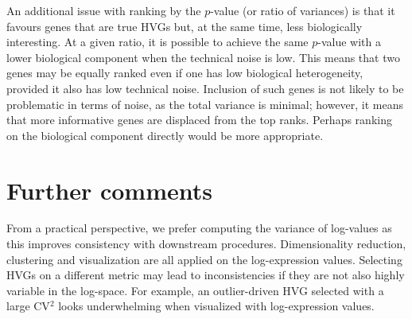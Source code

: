 \documentclass{article}
\begin{document}
An additional issue with ranking by the $p$-value (or ratio of variances) is that it favours genes that are true HVGs but, at the same time, less biologically interesting.
At a given ratio, it is possible to achieve the same $p$-value with a lower biological component when the technical noise is low.
This means that two genes may be equally ranked even if one has low biological heterogeneity, provided it also has low technical noise.
Inclusion of such genes is not likely to be problematic in terms of noise, as the total variance is minimal;
however, it means that more informative genes are displaced from the top ranks.
Perhaps ranking on the biological component directly would be more appropriate.

\section{Further comments}
From a practical perspective, we prefer computing the variance of log-values as this improves consistency with downstream procedures.
Dimensionality reduction, clustering and visualization are all applied on the log-expression values.
Selecting HVGs on a different metric may lead to inconsistencies if they are not also highly variable in the log-space.
For example, an outlier-driven HVG selected with a large CV$^2$ looks underwhelming when visualized with log-expression values.
\end{document}
